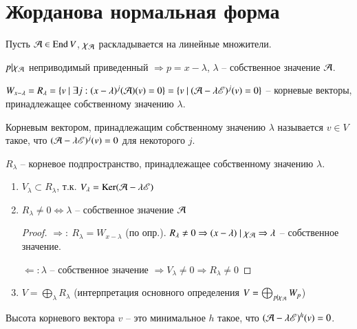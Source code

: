 \documentclass[main]{subfiles}
\begin{document}
\chapter{Жорданова нормальная форма}

Пусть $\mathcal{A} \in \operatorname{End} V$, $\chi_{\mathcal{A}}$ раскладывается на линейные множители.

$p| \chi_{\mathcal{A}}$ неприводимый приведенный $\Rightarrow p = x - \lambda$, $\lambda$ -- собственное значение $\mathcal{A}$.

$W_{x-\lambda} = R_{\lambda} = \{v \ | \ \exists j:(x-\lambda)^j (\mca) (v) = 0\} =
  \{v \ | \ (\mca - \lambda \mse )^j (v) = 0\}$ -- корневые векторы, принадлежащее собственному значению $\lambda$.

\begin{definition} 
  Корневым вектором, принадлежащим собственному значению $\lambda$ называется $v \in V$ такое, что $(\mathcal{A} - \lambda \mathscr{E})^j (v) = 0$ для некоторого $j$.

  $R_{\lambda}$ -- корневое подпространство, принадлежащее собственному значению $\lambda$.
\end{definition}

\begin{propertylist}
  \begin{enumerate}
    \item $V_{\lambda} \subset R_{\lambda}$, т.к. $V_{\lambda} = \operatorname{Ker}(\mathcal{A} - \lambda \mathscr{E})$
    \item $R_{\lambda} \neq 0 \Leftrightarrow \lambda$ -- собственное значение $\mathcal{A}$
          \begin{proof}
            $\Rightarrow: \ R_{\lambda} = W_{x-\lambda}$ (по опр.). $R_{\lambda} \neq 0 \Rightarrow
              (x - \lambda) \mid \chi_{\mathcal{A}} \Rightarrow \lambda$ -- собственное значение.

            $\Leftarrow: \lambda$ -- собственное значение $\Rightarrow V_{\lambda} \neq 0 \Rightarrow R_{\lambda} \neq 0$
          \end{proof}
    \item $V = \bigoplus_{\lambda} R_{\lambda}$ (интерпретация основного определения $V = \bigoplus_{p | \chi_{\mathcal{A}}} W_p$)
  \end{enumerate}
\end{propertylist}

\begin{definition} 
  Высота корневого вектора $v$ -- это минимальное $h$ такое, что $(\mathcal{A} - \lambda \mathscr{E})^h (v) = 0$.
\end{definition}
\end{document}

